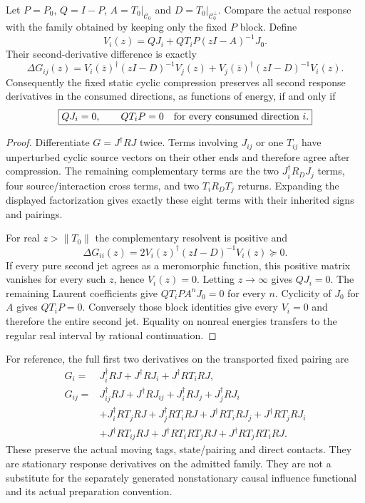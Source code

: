\documentclass[12pt,a4paper]{article}
\begin{document}
\begin{proposition}
\label{p4:prop:v251-static-cyclic-jet-defect}
Let $P=P_0$, $Q=I-P$, $A=T_0|_{\mathscr C_0}$ and
$D=T_0|_{\mathscr C_0^\perp}$. Compare the actual response with the family
obtained by keeping only the fixed $P$ block. Define
\[
 V_i(z)=QJ_i+QT_iP(zI-A)^{-1}J_0.
\]
Their second-derivative difference is exactly
\[
 \boxed{\Delta G_{ij}(z)=
 V_i(\bar z)^\dagger(zI-D)^{-1}V_j(z)
 +V_j(\bar z)^\dagger(zI-D)^{-1}V_i(z).}
\]
Consequently the fixed static cyclic compression preserves all second
response derivatives in the consumed directions, as functions of energy,
if and only if
\[
 \boxed{QJ_i=0,\qquad QT_iP=0\quad\hbox{for every consumed direction }i.}
\]
\end{proposition}
\begin{proof}
Differentiate $G=J^\dagger RJ$ twice. Terms involving $J_{ij}$ or one
$T_{ij}$ have unperturbed cyclic source vectors on their other ends and
therefore agree after compression. The remaining complementary terms are
the two $J_i^\dagger R_DJ_j$ terms, four source/interaction cross terms,
and two $T_iR_DT_j$ returns. Expanding the displayed factorization gives
exactly these eight terms with their inherited signs and pairings.

For real $z>\|T_0\|$ the complementary resolvent is positive and
\[
 \Delta G_{ii}(z)=2V_i(z)^\dagger(zI-D)^{-1}V_i(z)\succeq0.
\]
If every pure second jet agrees as a meromorphic function, this positive
matrix vanishes for every such $z$, hence $V_i(z)=0$. Letting $z\to\infty$
gives $QJ_i=0$. The remaining Laurent coefficients give
$QT_iPA^nJ_0=0$ for every $n$. Cyclicity of $J_0$ for $A$ gives
$QT_iP=0$. Conversely those block identities give every $V_i=0$ and
therefore the entire second jet. Equality on nonreal energies transfers
to the regular real interval by rational continuation.
\end{proof}

For reference, the full first two derivatives on the transported fixed
pairing are
\begin{align*}
 G_i={}&J_i^\dagger RJ+J^\dagger RJ_i+J^\dagger RT_iRJ,\\
 G_{ij}={}&J_{ij}^\dagger RJ+J^\dagger RJ_{ij}
   +J_i^\dagger RJ_j+J_j^\dagger RJ_i\\
 &+J_i^\dagger RT_jRJ+J_j^\dagger RT_iRJ
   +J^\dagger RT_iRJ_j+J^\dagger RT_jRJ_i\\
 &+J^\dagger RT_{ij}RJ
   +J^\dagger RT_iRT_jRJ+J^\dagger RT_jRT_iRJ.
\end{align*}
These preserve the actual moving tags, state/pairing and direct contacts.
They are stationary response derivatives on the admitted family. They
are not a substitute for the separately generated nonstationary causal
influence functional and its actual preparation convention.
\end{document}
